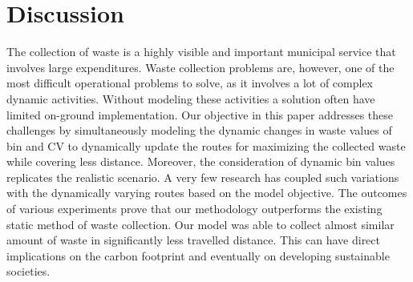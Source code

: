 \documentclass[12pt]{article}
\begin{document}






\section{Discussion}

The collection of waste is a highly visible and important municipal service that involves large expenditures. Waste collection problems are, however, one of the most difficult operational problems to solve, as it involves a lot of complex dynamic activities. Without modeling these activities a solution often have limited on-ground implementation. Our objective in this paper addresses these challenges by simultaneously modeling the dynamic changes in waste values of bin and CV to dynamically update the routes for maximizing the collected waste while covering less distance. Moreover, the consideration of dynamic bin values replicates the realistic scenario. A very few research has coupled such variations with the dynamically varying routes based on the model objective. The outcomes of various experiments prove that our methodology outperforms the existing static method of waste collection. Our model was able to collect almost similar amount of waste in significantly less travelled distance. This can have direct implications on the carbon footprint and eventually on developing sustainable societies.
\end{document}
